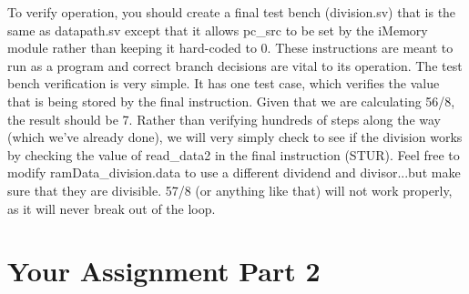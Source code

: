 To verify operation, you should create a final test bench (division.sv) that is the same as datapath.sv except that it allows pc\_src to be set by the iMemory module rather than keeping it hard-coded to 0.  These instructions are meant to run as a program and correct branch decisions are vital to its operation.  The test bench verification is very simple.  It has one test case, which verifies the value that is being stored by the final instruction.  Given that we are calculating 56/8, the result should be 7.  Rather than verifying hundreds of steps along the way (which we've already done), we will very simply check to see if the division works by checking the value of read\_data2 in the final instruction (STUR).  Feel free to modify ramData\_division.data to use a different dividend and divisor...but make sure that they are divisible.  57/8 (or anything like that) will not work properly, as it will never break out of the loop.



\section{Your Assignment Part 2}

